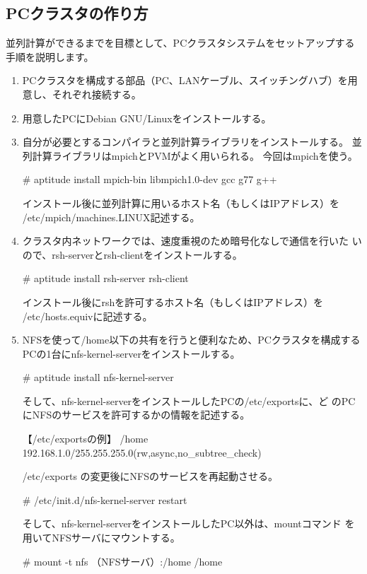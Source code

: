 \documentclass[mingoth,a4paper]{jsarticle}
\begin{document}
\subsection{PCクラスタの作り方}
並列計算ができるまでを目標として、PCクラスタシステムをセットアップする手順を説明します。
\begin{enumerate}
\item PCクラスタを構成する部品（PC、LANケーブル、スイッチングハブ）を用意し、それぞれ接続する。
\item 用意したPCにDebian GNU/Linuxをインストールする。
\item 自分が必要とするコンパイラと並列計算ライブラリをインストールする。
      並列計算ライブラリはmpichとPVMがよく用いられる。
      今回はmpichを使う。
\begin{commandline}
 # aptitude install mpich-bin libmpich1.0-dev gcc g77 g++
\end{commandline}
      インストール後に並列計算に用いるホスト名（もしくはIPアドレス）を
      /etc/mpich/machines.LINUX記述する。
\item クラスタ内ネットワークでは、速度重視のため暗号化なしで通信を行いた
      いので、rsh-serverとrsh-clientをインストールする。
\begin{commandline}
 # aptitude install rsh-server rsh-client
\end{commandline}
      インストール後にrshを許可するホスト名（もしくはIPアドレス）を
      /etc/hosts.equivに記述する。
\item NFSを使って/home以下の共有を行うと便利なため、PCクラスタを構成する
      PCの1台にnfs-kernel-serverをインストールする。
\begin{commandline}
 # aptitude install nfs-kernel-server
\end{commandline}
      そして、nfs-kernel-serverをインストールしたPCの/etc/exportsに、ど
      のPCにNFSのサービスを許可するかの情報を記述する。
\begin{commandline}
 【/etc/exportsの例】
 /home   192.168.1.0/255.255.255.0(rw,async,no_subtree_check)
\end{commandline}
      /etc/exports の変更後にNFSのサービスを再起動させる。
\begin{commandline}
 # /etc/init.d/nfs-kernel-server restart
\end{commandline}
      そして、nfs-kernel-serverをインストールしたPC以外は、mountコマンド
      を用いてNFSサーバにマウントする。
\begin{commandline}
 # mount -t nfs （NFSサーバ）:/home /home
\end{commandline}

\end{enumerate}
\end{document}
